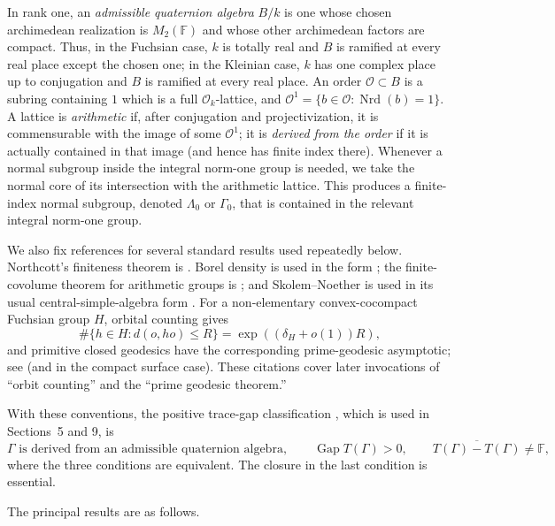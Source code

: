 \documentclass[11pt,reqno]{amsart}
\theoremstyle{definition}
\theoremstyle{remark}
\newcommand{\F}{\mathbb F}
\newcommand{\cO}{\mathcal O}
\newcommand{\Nrd}{\operatorname{Nrd}}
\newcommand{\Gap}{\operatorname{Gap}}
\begin{document}
In rank one, an \emph{admissible quaternion algebra} \(B/k\) is one whose
chosen archimedean realization is \(M_2(\F)\) and whose other archimedean
factors are compact.  Thus, in the Fuchsian case, \(k\) is totally real and
\(B\) is ramified at every real place except the chosen one; in the Kleinian
case, \(k\) has one complex place up to conjugation and \(B\) is ramified at
every real place.  An order \(\cO\subset B\) is a subring containing \(1\)
which is a full \(\cO_k\)-lattice, and
\(\cO^1=\{b\in\cO:\Nrd(b)=1\}\).  A lattice is \emph{arithmetic} if,
after conjugation and projectivization, it is commensurable with the image of
some \(\cO^1\); it is \emph{derived from the order} if it is actually
contained in that image (and hence has finite index there).  Whenever a
normal subgroup inside the integral norm-one group is needed, we take the
normal core of its intersection with the arithmetic lattice.  This produces
a finite-index normal subgroup, denoted \(\Lambda_0\) or \(\Gamma_0\), that
is contained in the relevant integral norm-one group.

We also fix references for several standard results used repeatedly below.
Northcott's finiteness theorem is
\cite[Theorem~1.6.8]{BombieriGubler}.  Borel density is used in the form
\cite{BorelDensity}; the finite-covolume theorem for arithmetic groups is
\cite{BorelHarishChandra}; and Skolem--Noether is used in its usual
central-simple-algebra form \cite[Section~12.6]{Pierce}.  For a non-elementary
convex-cocompact Fuchsian group \(H\), orbital counting gives
\[
 \#\{h\in H:d(o,ho)\le R\}=\exp((\delta_H+o(1))R),
\]
and primitive closed geodesics have the corresponding prime-geodesic
asymptotic; see \cite{Roblin} (and \cite[Chapter~9]{Buser} in the compact
surface case).  These citations cover later invocations of ``orbit
counting'' and the ``prime geodesic theorem.''

With these conventions, the positive trace-gap classification
\cite{Bogachev}, which is used in Sections~5 and 9, is
\[
 \Gamma\text{ is derived from an admissible quaternion algebra},\qquad
 \Gap T(\Gamma)>0,
 \qquad
 \overline{T(\Gamma)-T(\Gamma)}\ne\F,
\tag{1.1}
\]
where the three conditions are equivalent.  The closure in the last
condition is essential.

The principal results are as follows.
\end{document}
